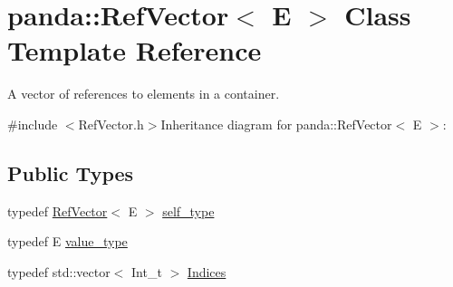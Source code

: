 \hypertarget{classpanda_1_1RefVector}{
\section{panda::RefVector$<$ E $>$ Class Template Reference}
\label{classpanda_1_1RefVector}
}


A vector of references to elements in a container.  


{\ttfamily \#include $<$RefVector.h$>$}Inheritance diagram for panda::RefVector$<$ E $>$:\subsection*{Public Types}
\begin{DoxyCompactItemize}
\item 
typedef \hyperlink{classpanda_1_1RefVector}{RefVector}$<$ E $>$ \hyperlink{classpanda_1_1RefVector_aa4b73d036e11c1acaa25d7dc6c5c3f5c}{self\_\-type}
\item 
typedef E \hyperlink{classpanda_1_1RefVector_ac553f3b6060e39d4418982e1a121d513}{value\_\-type}
\item 
typedef std::vector$<$ Int\_\-t $>$ \hyperlink{classpanda_1_1RefVector_a062e47758de4bd1c58242267d4aabef8}{Indices}
\end{DoxyCompactItemize}
